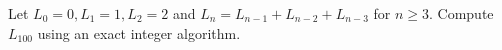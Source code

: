 Let $L_0=0,L_1=1,L_2=2$ and $L_n=L_{n-1}+L_{n-2}+L_{n-3}$ for $n\ge3$. Compute $L_{100}$ using an exact integer algorithm.
